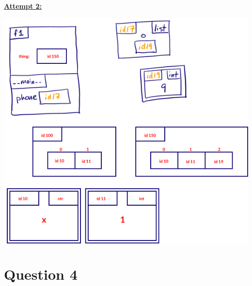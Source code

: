\documentclass[12pt]{article}
\begin{document}
\begin{mdframed}
    \underline{\textbf{Attempt 2:}}

    \bigskip

    \begin{center}
    \includegraphics[width=0.5\linewidth]{images/worksheet_1_q3_correction.png}
    \end{center}

\end{mdframed}

\section*{Question 4}
\end{document}

